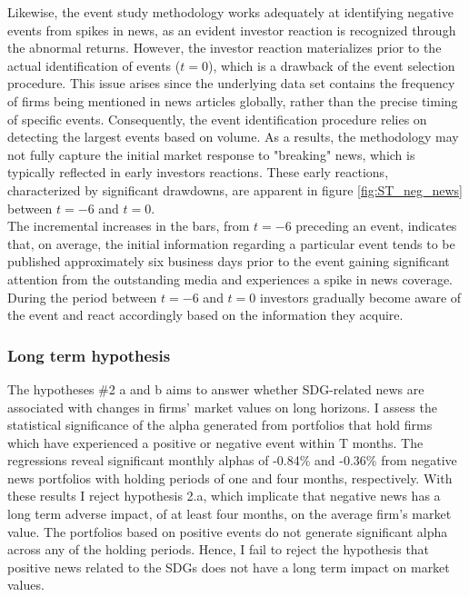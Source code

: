 Likewise, the event study methodology works adequately at identifying negative events from spikes in news, as an evident investor reaction is recognized through the abnormal returns. However, the investor reaction materializes prior to the actual identification of events ($t=0$), which is a drawback of the event selection procedure. This issue arises since the underlying data set contains the frequency of firms being mentioned in news articles globally, rather than the precise timing of specific events. Consequently, the event identification procedure relies on detecting the largest events based on volume. As a results, the methodology may not fully capture the initial market response to "breaking" news, which is typically reflected in early investors reactions. These early reactions, characterized by significant drawdowns, are apparent in figure \ref{fig:ST_neg_news} between $t = -6$ and $t = 0$. \\
The incremental increases in the bars, from $t=-6$ preceding an event, indicates that, on average, the initial information regarding a particular event tends to be published approximately six business days prior to the event gaining significant attention from the outstanding media and experiences a spike in news coverage. During the period between $t=-6$ and $t=0$ investors gradually become aware of the event and react accordingly based on the information they acquire. 


\subsubsection{Long term hypothesis}

The hypotheses \#2 a and b aims to answer whether SDG-related news are associated with changes in firms' market values on long horizons. I assess the statistical significance of the alpha generated from portfolios that hold firms which have experienced a positive or negative event within T months. The regressions reveal significant monthly alphas of -0.84\% and -0.36\% from negative news portfolios with holding periods of one and four months, respectively. With these results I reject hypothesis 2.a, which implicate that negative news has a long term adverse impact, of at least four months, on the average firm's market value. The portfolios based on positive events do not generate significant alpha across any of the holding periods. Hence, I fail to reject the hypothesis that positive news related to the SDGs does not have a long term impact on market values.

